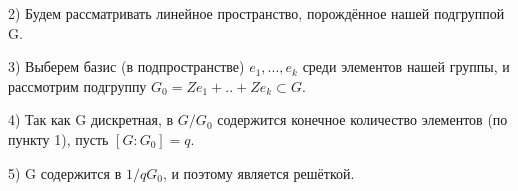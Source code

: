 2) Будем рассматривать линейное пространство, порождённое нашей подгруппой G. 

3) Выберем базис (в подпространстве) $e_1,...,e_k$ среди элементов нашей группы, и рассмотрим подгруппу $G_0 = Ze_1+..+Ze_k \subset G$.

4) Так как G дискретная, в $G/G_0$ содержится конечное количество элементов (по пункту 1), пусть $[G:G_0]=q$. 

5) G содержится в $1/q G_0$, и поэтому является решёткой. 